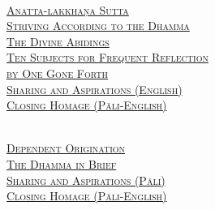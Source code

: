{  {\libertinusFont\selectfont\textbf{\textsc{\ifafive\fontsize{18}{12}\fi\ifninebythirteen\fontsize{13}{8.5}\fi\ifbfive\fontsize{22}{18}\fi\selectfont{}}}}\\
  \textsc{\ifafive\fontsize{14.4}{28}\fi\ifninebythirteen\fontsize{8.7}{17}\fi\ifbfive\fontsize{16}{33.5}\fi\selectfont
    \hyperref[anatta-lakkhana]{Anatta-lakkhaṇa Sutta} \ifdigital\else\pageref{anatta-lakkhana}\fi\\
    \hyperref[striving-according-to-dhamma]{Striving According to the Dhamma} \ifdigital\else\pageref{striving-according-to-dhamma}\fi\\
    \hyperref[divine-abidings]{The Divine Abidings} \ifdigital\else\pageref{divine-abidings}\fi\\
    \hyperref[ten-reflections]{Ten Subjects for Frequent Reflection\\ \ifafive\vspace{-0.4cm}\fi \ifbfive\vspace{-0.4cm}\fi \ifninebythirteen\vspace{-0.2cm}\fi by One Gone Forth} \ifdigital\else\pageref{ten-reflections}\fi\\
    \hyperref[sharing-aspirations]{Sharing and Aspirations (English)} \ifdigital\else\pageref{sharing-aspirations}\fi\\
    \hyperref[closing-homage]{Closing Homage (Pāli-English)} \ifdigital\else\pageref{closing-homage}\fi\\
  }

  \clearpage

  {\libertinusFont\selectfont\textbf{\textsc{\ifafive\fontsize{18}{12}\fi\ifninebythirteen\fontsize{13}{8.5}\fi\ifbfive\fontsize{22}{18}\fi\selectfont{}}}}\\
  \textsc{\ifafive\fontsize{14.4}{28}\fi\ifninebythirteen\fontsize{8.7}{17}\fi\ifbfive\fontsize{16}{33.5}\fi\selectfont
    \hyperref[dependent-origination]{Dependent Origination} \ifdigital\else\pageref{dependent-origination}\fi\\
    \hyperref[dhamma-in-brief]{The Dhamma in Brief} \ifdigital\else\pageref{dhamma-in-brief}\fi\\
    \hyperref[uddissanadhitthana]{Sharing and Aspirations (Pāli)} \ifdigital\else\pageref{uddissanadhitthana}\fi\\
    \hyperref[closing-homage]{Closing Homage (Pāli-English)} \ifdigital\else\pageref{closing-homage}\fi\\
  }

}
